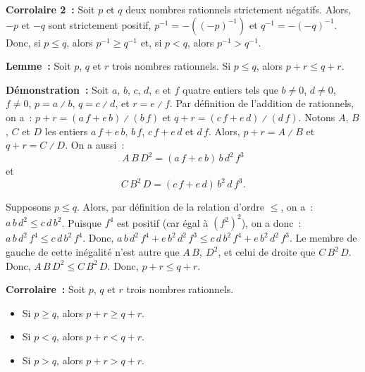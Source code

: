 \medskip

\noindent\textbf{Corrolaire 2 :} Soit $p$ et $q$ deux nombres rationnels strictement négatifs. 
    Alors, $-p$ et $-q$ sont strictement positif, $p^{-1} = -((-p)^{-1})$ et $q^{-1} = -(-q)^{-1}$.
    Donc, si $p \leq q$, alors $p^{-1} \geq q^{-1}$ et, si $p < q$, alors $p^{-1} > q^{-1}$. 

\medskip

\noindent\textbf{Lemme :} Soit $p$, $q$ et $r$ trois nombres rationnels.
    Si $p \leq q$, alors $p + r \leq q + r$.

\medskip

\noindent\textbf{Démonstration :} 
    Soit $a$, $b$, $c$, $d$, $e$ et $f$ quatre entiers tels que $b \neq 0$, $d \neq 0$, $f \neq 0$, $p = a \divslash b$, $q = c \divslash d$, et $r = e \divslash f$.
    Par définition de l'addition de rationnels, on a : $p + r = (a \, f + e \, b) \divslash (b \, f)$ et $q + r = (c \, f + e \, d) \divslash (d \, f)$.
    Notons $A$, $B$, $C$ et $D$ les entiers $a \, f + e \, b$, $b \, f$, $c \, f + e \, d$ et $d \, f$. 
    Alors, $p + r = A \divslash B$ et $q + r = C \divslash D$.
    On a aussi : 
    \begin{equation*}
        A \, B \, D^2 = (a \, f + e \, b) \, b \, d^2 \, f^3
    \end{equation*}
    et 
    \begin{equation*}
        C \, B^2 \, D = (c \, f + e \, d) \, b^2 \, d \, f^3.
    \end{equation*}

    Supposons $p \leq q$.
    Alors, par définition de la relation d'ordre $\leq$, on a : $a \, b \, d^2 \leq c \, d \, b^2$. 
    Puisque $f^4$ est positif (car égal à $(f^2)^2$), on a donc : $a \, b \, d^2 \, f^4 \leq c \, d \, b^2 \, f^4$.
    Donc, $a \, b \, d^2 \, f^4 + e \, b^2 \, d^2 \, f^3 \leq c \, d \, b^2 \, f^4 + e \, b^2 \, d^2 \, f^3$.
    Le membre de gauche de cette inégalité n'est autre que $A \, B ,\ D^2$, et celui de droite que $C \, B^2 \, D$.
    Donc, $A \, B \, D^2 \leq C \, B^2 \, D$.
    Donc, $p + r \leq q + r$.

    \done

\medskip

\noindent\textbf{Corrolaire :} Soit $p$, $q$ et $r$ trois nombres rationnels.
    \begin{itemize}[nosep]
        \item Si $p \geq q$, alors $p + r \geq q + r$.
        \item Si $p < q$, alors $p + r < q + r$.
        \item Si $p > q$, alors $p + r > q + r$.
    \end{itemize}

